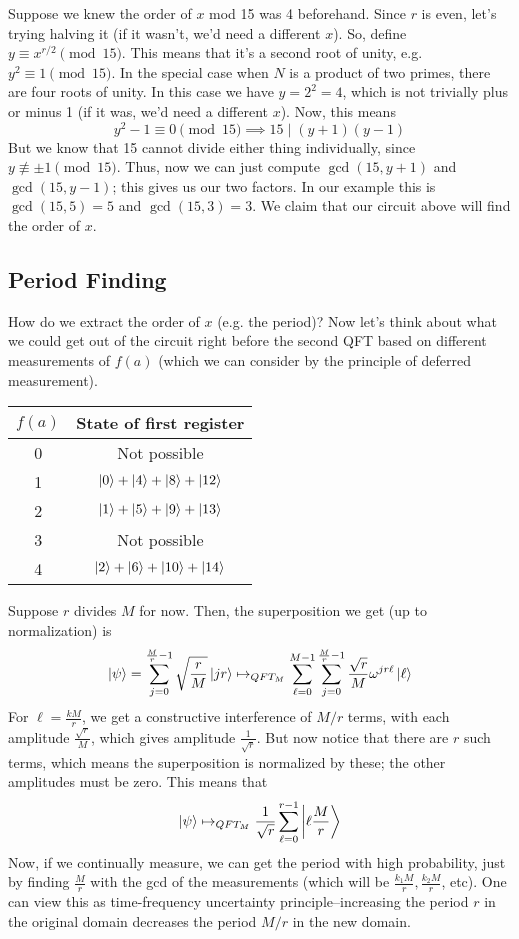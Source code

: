 Suppose we knew the order of $x$ mod 15
was 4 beforehand. Since $r$ is even, let's trying halving it (if it wasn't, we'd need a different $x$).
So, define $y \equiv x^{r/2} \pmod{15}$. This means that it's a second root of unity, e.g. $y^2 \equiv 1 \pmod{15}$.
In the special case when $N$ is a product of two primes, there are four roots of unity. In this case we have $y = 2^2 = 4$,
which is not trivially plus or minus 1 (if it was, we'd need a different $x$). Now, this means
\[ y^2 - 1 \equiv 0 \pmod{15} \implies 15 \mid (y + 1)(y - 1) \]
But we know that 15 cannot divide either thing individually, since $y \not\equiv \pm 1 \pmod{15}$.
Thus, now we can just compute $\gcd(15, y + 1)$ and $\gcd(15, y - 1)$; this gives us our two factors. In our example this is $\gcd(15, 5) = 5$ and
$\gcd(15, 3) = 3$. We claim that our circuit above will find the order of $x$.

\subsection{Period Finding}
How do we extract the order of $x$ (e.g. the period)?
Now let's think about what we could get out of the circuit right before the second QFT based on different measurements of $f(a)$ (which
we can consider by the principle of deferred measurement).

\begin{center}
\begin{tabular}[center]{c|c}
    $f(a)$ & State of first register \\ \hline
    0 & Not possible \\
    1 & $\ket{0} + \ket{4} + \ket{8} + \ket{12}$ \\
    2 & $\ket{1} + \ket{5} + \ket{9} + \ket{13}$ \\
    3 & Not possible \\
    4 & $\ket{2} + \ket{6} + \ket{10} + \ket{14}$
\end{tabular}
\end{center}

Suppose $r$ divides $M$ for now. Then, the superposition we get (up to normalization) is
\[ \ket{\psi} = \sum_{j = 0}^{\frac{M}{r} - 1} \sqrt{\frac{r}{M}}\ket{jr} \mapsto_{QFT_M} \sum_{\ell = 0}^{M - 1} \sum_{j = 0}^{\frac{M}{r} - 1} \frac{\sqrt{r}}{M} \omega^{jr\ell} \ket{\ell} \]
For $\ell = \frac{k M}{r}$, we get a constructive interference of $M/r$ terms, with each amplitude $\frac{\sqrt{r}}{M}$, which gives amplitude
$\frac{1}{\sqrt{r}}$. But now notice that there are $r$ such terms, which means the superposition is normalized by these; the other amplitudes must be zero.
This means that 
\[ \ket{\psi} \mapsto_{QFT_M} \frac{1}{\sqrt{r}} \sum_{\ell = 0}^{r - 1} \ket{\ell \frac{M}{r}}\]
Now, if we continually measure, we can get the period with high probability, just by finding $\frac{M}{r}$ with the gcd of the measurements (which will be $\frac{k_1 M}{r}, \frac{k_2 M}{r}$, etc).
One can view this as time-frequency uncertainty principle--increasing the period $r$ in the original domain decreases the period $M/r$ in the new domain.

